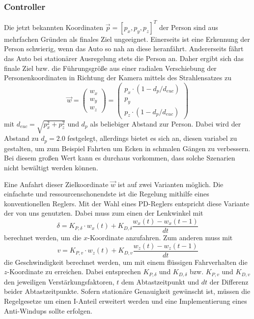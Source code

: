\subsubsection{Controller}
\label{subsec:03controller}
Die jetzt bekannten Koordinaten $\vec{p} = [p_x, p_y, p_z]^T$ der Person sind aus mehrfachen Gründen als finales Ziel ungeeignet. Einerseits ist eine Erkennung der Person schwierig, wenn das Auto so nah an diese heranfährt. Andererseits fährt das Auto bei stationärer Ausregelung stets die Person an. Daher ergibt sich das finale Ziel bzw. die Führungsgröße aus einer radialen Verschiebung der Personenkoordinaten in Richtung der Kamera mittels des Strahlensatzes zu 
\begin{equation}
	\vec{w} =
	\begin{pmatrix}
		w_x \\w_y \\w_z
	\end{pmatrix}=
	\begin{pmatrix}
		p_x \cdot (1 - d_p / d_{euc})\\ p_y \\ p_z \cdot (1 - d_p / d_{euc})
	\end{pmatrix}
\end{equation}
mit $d_{euc} = \sqrt{p_x^2 + p_z^2}$ und $d_p$ als beliebiger Abstand zur Person. Dabei wird der Abstand zu $d_p = 2.0$ festgelegt, allerdings bietet es sich an, diesen variabel zu gestalten, um zum Beispiel Fahrten um Ecken in schmalen Gängen zu verbessern. Bei diesem großen Wert kann es durchaus vorkommen, dass solche Szenarien nicht bewältigt werden können.

Eine Anfahrt dieser Zielkoordinate $\vec{w}$ ist auf zwei Varianten möglich. Die einfachste und ressourcenschonendste ist die Regelung mithilfe eines konventionellen Reglers. Mit der Wahl eines PD-Reglers entspricht diese Variante der von uns genutzten. Dabei muss zum einen der Lenkwinkel mit
\begin{equation}
	\delta = K_{P, \delta} \cdot w_x(t) + K_{D, \delta} \frac{w_x(t) - w_x(t-1)}{dt}
\end{equation}
berechnet werden, um die $x$-Koordinate anzufahren. Zum anderen muss mit
\begin{equation}
	v = K_{P, v} \cdot w_z(t) + K_{D, v} \frac{w_z(t) - w_z(t-1)}{dt}
\end{equation}
die Geschwindigkeit berechnet werden, um mit einem flüssigen Fahrverhalten die $z$-Koordinate zu erreichen. Dabei entsprechen $K_{P, \delta}$ und $K_{D, \delta}$ bzw. $K_{P, v}$ und $K_{D, v}$ den jeweiligen Verstärkungsfaktoren, $t$ dem Abtastzeitpunkt und $dt$ der Differenz beider Abtastzeitpunkte. Sofern stationäre Genauigkeit gewünscht ist, müssen die Regelgesetze um einen I-Anteil erweitert werden und eine Implementierung eines Anti-Windups sollte erfolgen.

